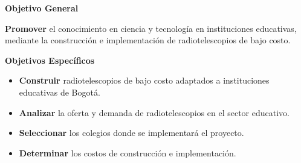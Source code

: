 \begin{frame}{\textbf{Objetivo General}}
  \begin{block}{}
    \centering
    \textbf{Promover} el conocimiento en \alert{ciencia y tecnología} en instituciones educativas, mediante la \alert{construcción e implementación} de radiotelescopios de bajo costo.
  \end{block}
\end{frame}

\begin{frame}{\textbf{Objetivos Específicos}}
  \begin{itemize}
    \item \textbf{Construir} radiotelescopios de \alert{bajo costo} adaptados a instituciones educativas de Bogotá.
      \pause
    \item \textbf{Analizar} la \alert{oferta y demanda} de radiotelescopios en el sector educativo.
      \pause
    \item \textbf{Seleccionar} los \alert{colegios} donde se implementará el proyecto.
      \pause
    \item \textbf{Determinar} los \alert{costos} de construcción e implementación.
  \end{itemize}
\end{frame}
